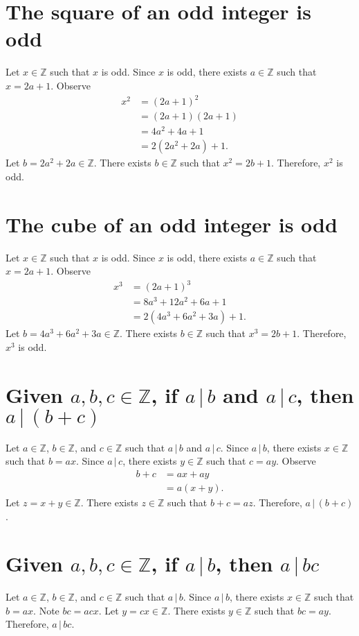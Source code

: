 \documentclass[12pt]{article}
\begin{document}
\section{The square of an odd integer is odd}
Let $x\in\mathbb{Z}$ such that $x$ is odd. Since $x$ is odd, there exists $a\in\mathbb{Z}$ such that $x=2a+1$. Observe
\begin{align*}
x^2
&=(2a+1)^2\\
&=(2a+1)(2a+1)\\
&=4a^2+4a+1\\
&=2(2a^2+2a)+1.
\end{align*}
Let $b=2a^2+2a\in\mathbb{Z}$. There exists $b\in\mathbb{Z}$ such that $x^2=2b+1$. Therefore, $x^2$ is odd.
\section{The cube of an odd integer is odd}
Let $x\in\mathbb{Z}$ such that $x$ is odd. Since $x$ is odd, there exists $a\in\mathbb{Z}$ such that $x=2a+1$. Observe
\begin{align*}
x^3
&=(2a+1)^3\\
&=8a^3+12a^2+6a+1\\
&=2(4a^3+6a^2+3a)+1.
\end{align*}
Let $b=4a^3+6a^2+3a\in\mathbb{Z}$. There exists $b\in\mathbb{Z}$ such that $x^3=2b+1$. Therefore, $x^3$ is odd.
\section{Given $a,b,c\in\mathbb{Z}$, if $a\,|\,b$ and $a\,|\,c$, then $a\,|\,(b+c)$}
Let $a\in\mathbb{Z}$, $b\in\mathbb{Z}$, and $c\in\mathbb{Z}$ such that $a\,|\,b$ and $a\,|\,c$. Since $a\,|\,b$, there exists $x\in\mathbb{Z}$ such that $b=ax$. Since $a\,|\,c$, there exists $y\in\mathbb{Z}$ such that $c=ay$. Observe
\begin{align*}
b+c
&=ax+ay\\
&=a(x+y).
\end{align*}
Let $z=x+y\in\mathbb{Z}$. There exists $z\in\mathbb{Z}$ such that $b+c=az$. Therefore, $a\,|\,(b+c)$.
\section{Given $a,b,c\in\mathbb{Z}$, if $a\,|\,b$, then $a\,|\,bc$}
Let $a\in\mathbb{Z}$, $b\in\mathbb{Z}$, and $c\in\mathbb{Z}$ such that $a\,|\,b$. Since $a\,|\,b$, there exists $x\in\mathbb{Z}$ such that $b=ax$. Note $bc=acx$. Let $y=cx\in\mathbb{Z}$. There exists $y\in\mathbb{Z}$ such that $bc=ay$. Therefore, $a\,|\,bc$.
\end{document}
